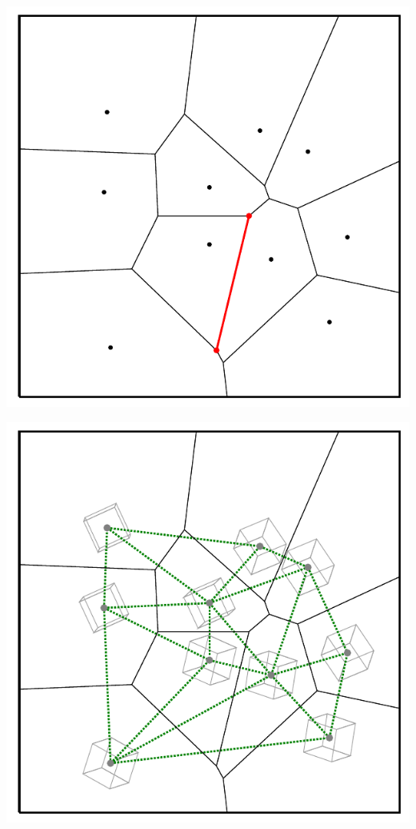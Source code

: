 \begin{frame}[fragile]
\begin{overprint}
\begin{center}
\includegraphics[height=0.9\textheight]{fig/voronoi-v2}
\par\end{center}


\begin{center}
\includegraphics[height=0.9\textheight]{fig/voronoi-iom-ad}
\par\end{center}



\end{overprint}
\end{frame}
